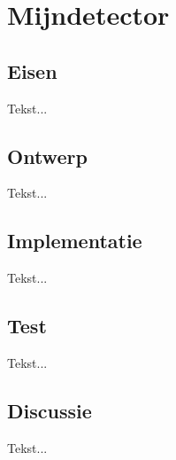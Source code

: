 \chapter[Mijndetector]{Mijndetector} \label {chapter:mijndetector}

	\section{Eisen}
		Tekst...
	\section{Ontwerp}
		Tekst...
	\section{Implementatie}
		Tekst...
	\section{Test}
		Tekst...
	\section{Discussie}
		Tekst...

